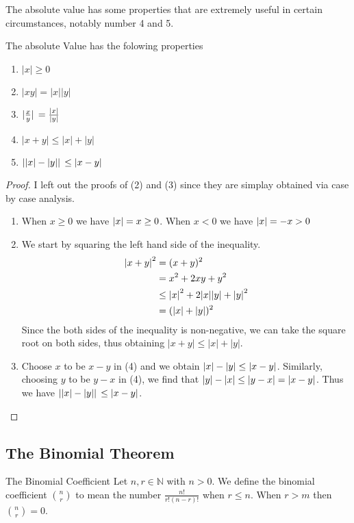 \documentclass[a4paper]{article}
\begin{document}
The absolute value has some properties that are extremely useful in certain circumstances, notably number 4 and 5. 

\begin{prp}{}{} The absolute Value has the folowing properties
\begin{enumerate}
\item $|x|\geq0$
\item $|xy|=|x||y|$
\item $\abs*{\frac{x}{y}}=\frac{|x|}{|y|}$
\item $|x+y|\leq|x|+|y|$
\item $\abs*{|x|-|y|}\leq|x-y|$
\end{enumerate}
\end{prp}
\begin{proof}  I left out the proofs of (2) and (3) since they are simplay obtained via case by case analysis. 
\begin{enumerate}
\item When $x\geq0$ we have $\abs{x}=x\geq0$. When $x<0$ we have $\abs{x}=-x>0$
\item We start by squaring the left hand side of the inequality. 
\begin{align*}
\abs{x+y}^2&=(x+y)^2 \\
&=x^2+2xy+y^2 \\
&\leq \abs{x}^2+2\abs{x}\abs{y}+\abs{y}^2 \\
&=(\abs{x}+\abs{y})^2
\end{align*}
Since the both sides of the inequality is non-negative, we can take the square root on both sides, thus obtaining $|x+y|\leq|x|+|y|$. 
\item Choose $x$ to be $x-y$ in (4) and we obtain $\abs{x}-\abs{y}\leq\abs{x-y}$. Similarly, choosing $y$ to be $y-x$ in (4), we find that $\abs{y}-\abs{x}\leq\abs{y-x}=\abs{x-y}$. Thus we have $\abs*{|x|-|y|}\leq|x-y|$. 
\end{enumerate}
\end{proof}

\subsection{The Binomial Theorem}
\begin{defn}{The Binomial Coefficient}{} Let $n,r\in\mathbb{N}$ with $n>0$. We define the binomial coefficient $\binom{n}{r}$ to mean the number $\frac{n!}{r!(n-r)!}$ when $r\leq n$. When $r>m$ then $\binom{n}{r}=0$. 
\end{defn}
\end{document}
